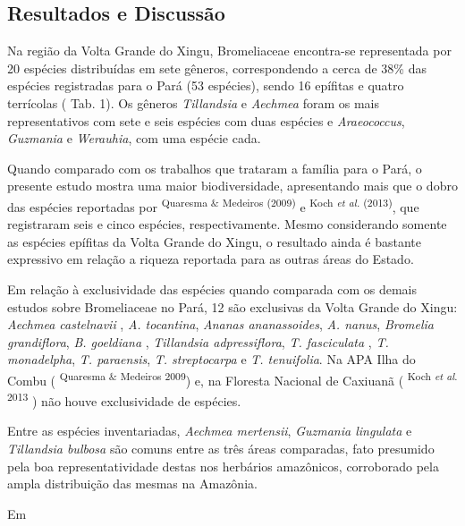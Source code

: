 \begin{multicols}{2}
\section*{Resultados e Discussão}
\par{}Na região da Volta Grande do Xingu,\allowbreak{} Bromeliaceae encontra-\allowbreak{}se representada por 20 espécies distribuídas em sete gêneros,\allowbreak{} correspondendo a cerca de 38\%\allowbreak{\allowbreak{}\allowbreak{}}\allowbreak{} das espécies registradas para o Pará (\allowbreak{}53 espécies)\allowbreak{},\allowbreak{} sendo 16 epífitas e quatro terrícolas (\allowbreak{} Tab.\allowbreak{} 1)\allowbreak{}.\allowbreak{} Os gêneros \textit{Tillandsia} e \textit{Aechmea} foram os mais representativos com sete e seis espécies com duas espécies e \textit{Araeococcus},\allowbreak{} \textit{Guzmania} e \textit{Werauhia},\allowbreak{} com uma espécie cada.\allowbreak{}\par{}Quando comparado com os trabalhos que trataram a família para o Pará,\allowbreak{} o presente estudo mostra uma maior biodiversidade,\allowbreak{} apresentando mais que o dobro das espécies reportadas por \textsuperscript{Quaresma \&\allowbreak{\allowbreak{}\allowbreak{}}\allowbreak{} Medeiros (\allowbreak{}2009)\allowbreak{}} e \textsuperscript{Koch \textit{et al.\allowbreak{}} (\allowbreak{}2013)\allowbreak{}},\allowbreak{} que registraram seis e cinco espécies,\allowbreak{} respectivamente.\allowbreak{} Mesmo considerando somente as espécies epífitas da Volta Grande do Xingu,\allowbreak{} o resultado ainda é bastante expressivo em relação a riqueza reportada para as outras áreas do Estado.\allowbreak{}\par{}Em relação à exclusividade das espécies quando comparada com os demais estudos sobre Bromeliaceae no Pará,\allowbreak{} 12 são exclusivas da Volta Grande do Xingu:\allowbreak{} \textit{Aechmea castelnavii },\allowbreak{} \textit{A.\allowbreak{} tocantina},\allowbreak{} \textit{Ananas ananassoides},\allowbreak{} \textit{A.\allowbreak{} nanus},\allowbreak{} \textit{Bromelia grandiflora},\allowbreak{} \textit{B.\allowbreak{} goeldiana },\allowbreak{} \textit{Tillandsia adpressiflora},\allowbreak{} \textit{T.\allowbreak{} fasciculata },\allowbreak{} \textit{T.\allowbreak{} monadelpha},\allowbreak{} \textit{T.\allowbreak{} paraensis},\allowbreak{} \textit{T.\allowbreak{} streptocarpa} e \textit{T.\allowbreak{} tenuifolia}.\allowbreak{} Na APA Ilha do Combu (\allowbreak{} \textsuperscript{Quaresma \&\allowbreak{\allowbreak{}\allowbreak{}}\allowbreak{} Medeiros 2009})\allowbreak{} e,\allowbreak{} na Floresta Nacional de Caxiuanã (\allowbreak{} \textsuperscript{Koch \textit{et al}.\allowbreak{} 2013 })\allowbreak{} não houve exclusividade de espécies.\allowbreak{}\par{}Entre as espécies inventariadas,\allowbreak{} \textit{Aechmea mertensii},\allowbreak{} \textit{Guzmania lingulata } e \textit{Tillandsia bulbosa} são comuns entre as três áreas comparadas,\allowbreak{} fato presumido pela boa representatividade destas nos herbários amazônicos,\allowbreak{} corroborado pela ampla distribuição das mesmas na Amazônia.\allowbreak{}\par{}Em 
\end{multicols}

